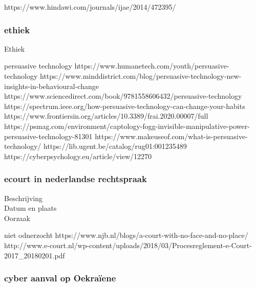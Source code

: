 https://www.hindawi.com/journals/ijae/2014/472395/ 


\subsubsection{ethiek}


Ethiek 



persuasive technology 
https://www.humanetech.com/youth/persuasive-technology 
https://www.minddistrict.com/blog/persuasive-technology-new-insights-in-behavioural-change 
https://www.sciencedirect.com/book/9781558606432/persuasive-technology 
https://spectrum.ieee.org/how-persuasive-technology-can-change-your-habits 
https://www.frontiersin.org/articles/10.3389/frai.2020.00007/full 
https://psmag.com/environment/captology-fogg-invisible-manipulative-power-persuasive-technology-81301 
https://www.makeuseof.com/what-is-persuasive-technology/ 
https://lib.ugent.be/catalog/rug01:001235489 
https://cyberpsychology.eu/article/view/12270 



\subsubsection{ecourt in nederlandse rechtspraak}

	\begin{description}
	\item[Beschrijving]
	\item[Datum en plaats] 
	\item[Oorzaak]
\end{description}
niet odnerzocht
https://www.njb.nl/blogs/a-court-with-no-face-and-no-place/ 
http://www.e-court.nl/wp-content/uploads/2018/03/Procesreglement-e-Court-2017_20180201.pdf

\subsubsection{ cyber aanval op Oekraïene }

